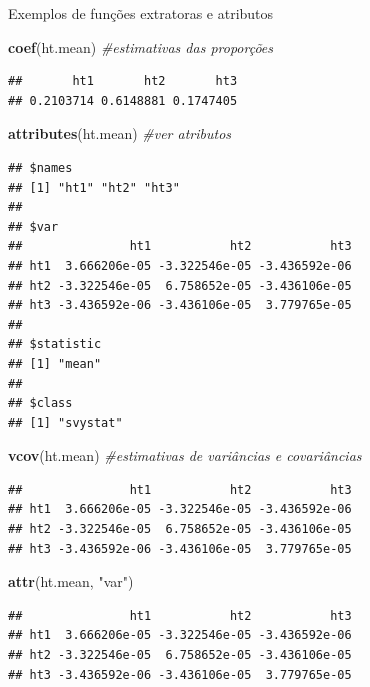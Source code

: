 \documentclass[]{book}
\newenvironment{Shaded}{\begin{snugshade}}{\end{snugshade}}
\newcommand{\KeywordTok}[1]{\textcolor[rgb]{0.13,0.29,0.53}{\textbf{{#1}}}}
\newcommand{\StringTok}[1]{\textcolor[rgb]{0.31,0.60,0.02}{{#1}}}
\newcommand{\CommentTok}[1]{\textcolor[rgb]{0.56,0.35,0.01}{\textit{{#1}}}}
\newcommand{\NormalTok}[1]{{#1}}
\numberwithin{example}{chapter}
\numberwithin{remark}{chapter}
\numberwithin{definition}{chapter}
\begin{document}
Exemplos de funções extratoras e atributos

\begin{Shaded}
\begin{Highlighting}[]
\KeywordTok{coef}\NormalTok{(ht.mean)                         }\CommentTok{#estimativas das proporções}
\end{Highlighting}
\end{Shaded}

\begin{verbatim}
##       ht1       ht2       ht3 
## 0.2103714 0.6148881 0.1747405
\end{verbatim}

\begin{Shaded}
\begin{Highlighting}[]
\KeywordTok{attributes}\NormalTok{(ht.mean)                          }\CommentTok{#ver atributos}
\end{Highlighting}
\end{Shaded}

\begin{verbatim}
## $names
## [1] "ht1" "ht2" "ht3"
## 
## $var
##               ht1           ht2           ht3
## ht1  3.666206e-05 -3.322546e-05 -3.436592e-06
## ht2 -3.322546e-05  6.758652e-05 -3.436106e-05
## ht3 -3.436592e-06 -3.436106e-05  3.779765e-05
## 
## $statistic
## [1] "mean"
## 
## $class
## [1] "svystat"
\end{verbatim}

\begin{Shaded}
\begin{Highlighting}[]
\KeywordTok{vcov}\NormalTok{(ht.mean)                         }\CommentTok{#estimativas de variâncias e covariâncias}
\end{Highlighting}
\end{Shaded}

\begin{verbatim}
##               ht1           ht2           ht3
## ht1  3.666206e-05 -3.322546e-05 -3.436592e-06
## ht2 -3.322546e-05  6.758652e-05 -3.436106e-05
## ht3 -3.436592e-06 -3.436106e-05  3.779765e-05
\end{verbatim}

\begin{Shaded}
\begin{Highlighting}[]
\KeywordTok{attr}\NormalTok{(ht.mean, }\StringTok{"var"}\NormalTok{)}
\end{Highlighting}
\end{Shaded}

\begin{verbatim}
##               ht1           ht2           ht3
## ht1  3.666206e-05 -3.322546e-05 -3.436592e-06
## ht2 -3.322546e-05  6.758652e-05 -3.436106e-05
## ht3 -3.436592e-06 -3.436106e-05  3.779765e-05
\end{verbatim}
\end{document}

